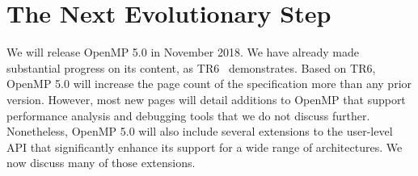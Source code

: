 \section{The Next Evolutionary Step}
\label{sec:in_progress}

We will release OpenMP 5.0 in November 2018. We have already made 
substantial progress on its content, as TR6~\cite{openmptr6} demonstrates.
Based on TR6, OpenMP 5.0 will increase the page count of the specification 
more than any prior version. However, most new pages will detail additions 
to OpenMP that support performance analysis and debugging tools that we do not
discuss further. Nonetheless, OpenMP 5.0 will also include several extensions 
to the user-level API that significantly enhance its support for a wide 
range of architectures. We now discuss many of those extensions.









   

